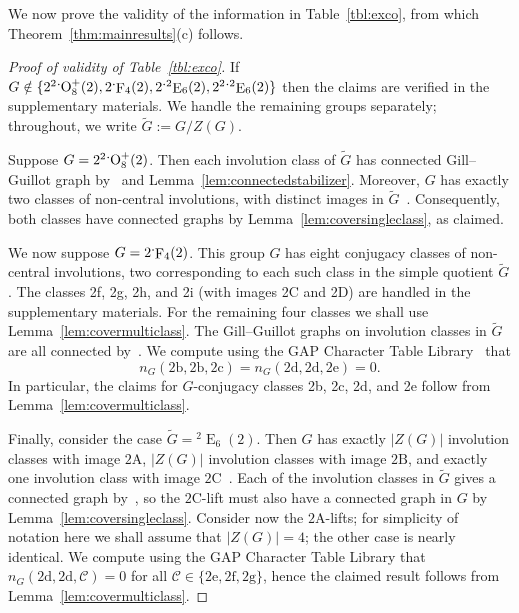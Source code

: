 \documentclass[11pt,a4paper]{amsart}
\theoremstyle{plain}
\theoremstyle{definition}
\theoremstyle{remark}
\newcounter{claim}[definition]
\theoremstyle{remark}
\theoremstyle{remark}
\theoremstyle{definition}
\newcommand{\ns}{\mathbin{\mspace{-4mu}\vcenter{\hbox{\raisebox{1ex}{$\cdot$}}}\mspace{-4mu}}}
\newcommand{\twist}[1]{%
  {}^{2}\!#1%
}
\DeclareMathOperator{\E}{E}
\DeclareMathOperator{\F}{F}
\begin{document}
We now prove the validity of the information in Table~\ref{tbl:exco}, from which Theorem~\ref{thm:mainresults}(c) follows.

\begin{proof}[Proof of validity of Table~\ref{tbl:exco}]
If $G\notin\{2^2\ns\mathrm{O}_8^+(2),2\ns\F_4(2), 2\ns\twist\E_6(2),2^2\ns\twist\E_6(2)\}$ then the claims are verified in the supplementary materials. We handle the remaining groups separately; throughout, we write $\widetilde{G}:=G/Z(G)$.

Suppose $G=2^2\ns\mathrm{O}_8^+(2)$. Then each involution class of $\widetilde{G}$ has connected Gill--Guillot graph by~\cite[Theorem 2]{GGL25} and Lemma~\ref{lem:connectedstabilizer}. Moreover, $G$ has exactly two classes of non-central involutions, with distinct images in $\widetilde{G}$~\cite{atlas}. Consequently, both classes have connected graphs by Lemma~\ref{lem:coversingleclass}, as claimed.

We now suppose $G=2\ns\F_4(2)$. This group $G$ has eight conjugacy classes of non-central involutions, two corresponding to each such class in the simple quotient $\widetilde{G}$. The classes 2f, 2g, 2h, and 2i (with images 2C and 2D) are handled in the supplementary materials. For the remaining four classes we shall use Lemma~\ref{lem:covermulticlass}. The Gill--Guillot graphs on involution classes in $\widetilde{G}$ are all connected by~\cite[Theorem 2]{GGL25}. We compute using the {\sf GAP} Character Table Library~\cite{CTblLib1.3.11} that \[n_G(\mathrm{2b,2b,2c})=n_G(\mathrm{2d,2d,2e})=0.\]
In particular, the claims for $G$-conjugacy classes 2b, 2c, 2d, and 2e follow from Lemma~\ref{lem:covermulticlass}.

Finally, consider the case $\widetilde{G}=\twist\E_6(2)$. Then $G$ has exactly $|Z(G)|$ involution classes with image $\mathrm{2A}$, $|Z(G)|$ involution classes with image $\mathrm{2B}$, and exactly one involution class with image $\mathrm{2C}$~\cite{atlas}. Each of the involution classes in $\widetilde{G}$ gives a connected graph by~\cite[Theorem 2]{GGL25}, so the $\mathrm{2C}$-lift must also have a connected graph in $G$ by Lemma~\ref{lem:coversingleclass}. Consider now the $\mathrm{2A}$-lifts; for simplicity of notation here we shall assume that $|Z(G)|=4$; the other case is nearly identical. We compute using the {\sf GAP} Character Table Library that $n_G(\mathrm{2d},\mathrm{2d},\mathcal{C})=0$ for all $\mathcal{C}\in\{\mathrm{2e,2f,2g}\}$, hence the claimed result follows from Lemma~\ref{lem:covermulticlass}.


\end{proof}
\end{document}
